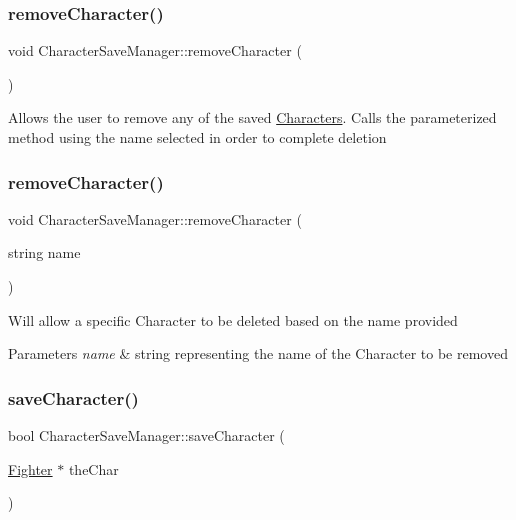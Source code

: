 \subsubsection{\texorpdfstring{remove\+Character()}{removeCharacter()}\hspace{0.1cm}{\footnotesize\ttfamily [1/2]}}
{\footnotesize\ttfamily void Character\+Save\+Manager\+::remove\+Character (\begin{DoxyParamCaption}{ }\end{DoxyParamCaption})\hspace{0.3cm}{\ttfamily [static]}}

Allows the user to remove any of the saved \hyperlink{class_characters}{Characters}. Calls the parameterized method using the name selected in order to complete deletion \hypertarget{class_character_save_manager_a49dd1eedbdf0e2b7cedfba64d4fb8d53}{}\label{class_character_save_manager_a49dd1eedbdf0e2b7cedfba64d4fb8d53} 
\subsubsection{\texorpdfstring{remove\+Character()}{removeCharacter()}\hspace{0.1cm}{\footnotesize\ttfamily [2/2]}}
{\footnotesize\ttfamily void Character\+Save\+Manager\+::remove\+Character (\begin{DoxyParamCaption}\item[{string}]{name }\end{DoxyParamCaption})\hspace{0.3cm}{\ttfamily [static]}}

Will allow a specific Character to be deleted based on the name provided 
\begin{DoxyParams}{Parameters}
{\em name} & string representing the name of the Character to be removed \\
\hline
\end{DoxyParams}
\hypertarget{class_character_save_manager_a7e4ce04eed479a22b1d3f70c9fe06652}{}\label{class_character_save_manager_a7e4ce04eed479a22b1d3f70c9fe06652} 
\subsubsection{\texorpdfstring{save\+Character()}{saveCharacter()}}
{\footnotesize\ttfamily bool Character\+Save\+Manager\+::save\+Character (\begin{DoxyParamCaption}\item[{\hyperlink{class_fighter}{Fighter} $\ast$}]{the\+Char }\end{DoxyParamCaption})\hspace{0.3cm}{\ttfamily [static]}}

